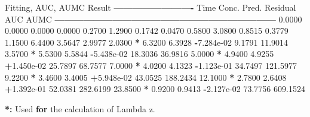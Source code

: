 \documentclass[12pt,]{krantz}
\newenvironment{Shaded}{\begin{snugshade}}{\end{snugshade}}
\newcommand{\FloatTok}[1]{\textcolor[rgb]{0.00,0.00,0.81}{#1}}
\newcommand{\StringTok}[1]{\textcolor[rgb]{0.31,0.60,0.02}{#1}}
\newcommand{\ControlFlowTok}[1]{\textcolor[rgb]{0.13,0.29,0.53}{\textbf{#1}}}
\newcommand{\OperatorTok}[1]{\textcolor[rgb]{0.81,0.36,0.00}{\textbf{#1}}}
\newcommand{\ErrorTok}[1]{\textcolor[rgb]{0.64,0.00,0.00}{\textbf{#1}}}
\newcommand{\NormalTok}[1]{#1}
\theoremstyle{definition}
\theoremstyle{definition}
\theoremstyle{definition}
\theoremstyle{remark}
\begin{document}
\begin{Shaded}
\begin{Highlighting}[]
\NormalTok{Fitting, AUC, AUMC Result}
\OperatorTok{-------------------------}
\StringTok{      }\NormalTok{Time         Conc.      Pred.   Residual       AUC       AUMC}
\OperatorTok{---------------------------------------------------------------------}
\StringTok{     }\FloatTok{0.0000}       \FloatTok{0.0000}                           \FloatTok{0.0000}     \FloatTok{0.0000}
     \FloatTok{0.2700}       \FloatTok{1.2900}                           \FloatTok{0.1742}     \FloatTok{0.0470}
     \FloatTok{0.5800}       \FloatTok{3.0800}                           \FloatTok{0.8515}     \FloatTok{0.3779}
     \FloatTok{1.1500}       \FloatTok{6.4400}                           \FloatTok{3.5647}     \FloatTok{2.9977}
     \FloatTok{2.0300} \OperatorTok{*}\StringTok{     }\FloatTok{6.3200}     \FloatTok{6.3928} \OperatorTok{-}\FloatTok{7.284e-02}     \FloatTok{9.1791}    \FloatTok{11.9014}
     \FloatTok{3.5700} \OperatorTok{*}\StringTok{     }\FloatTok{5.5300}     \FloatTok{5.5844} \OperatorTok{-}\FloatTok{5.438e-02}    \FloatTok{18.3036}    \FloatTok{36.9816}
     \FloatTok{5.0000} \OperatorTok{*}\StringTok{     }\FloatTok{4.9400}     \FloatTok{4.9255} \OperatorTok{+}\FloatTok{1.450e-02}    \FloatTok{25.7897}    \FloatTok{68.7577}
     \FloatTok{7.0000} \OperatorTok{*}\StringTok{     }\FloatTok{4.0200}     \FloatTok{4.1323} \OperatorTok{-}\FloatTok{1.123e-01}    \FloatTok{34.7497}   \FloatTok{121.5977}
     \FloatTok{9.2200} \OperatorTok{*}\StringTok{     }\FloatTok{3.4600}     \FloatTok{3.4005} \OperatorTok{+}\FloatTok{5.948e-02}    \FloatTok{43.0525}   \FloatTok{188.2434}
    \FloatTok{12.1000} \OperatorTok{*}\StringTok{     }\FloatTok{2.7800}     \FloatTok{2.6408} \OperatorTok{+}\FloatTok{1.392e-01}    \FloatTok{52.0381}   \FloatTok{282.6199}
    \FloatTok{23.8500} \OperatorTok{*}\StringTok{     }\FloatTok{0.9200}     \FloatTok{0.9413} \OperatorTok{-}\FloatTok{2.127e-02}    \FloatTok{73.7756}   \FloatTok{609.1524}

\OperatorTok{*}\ErrorTok{:}\StringTok{ }\NormalTok{Used }\ControlFlowTok{for}\NormalTok{ the calculation of Lambda z.}



\end{Highlighting}
\end{Shaded}
\end{document}
